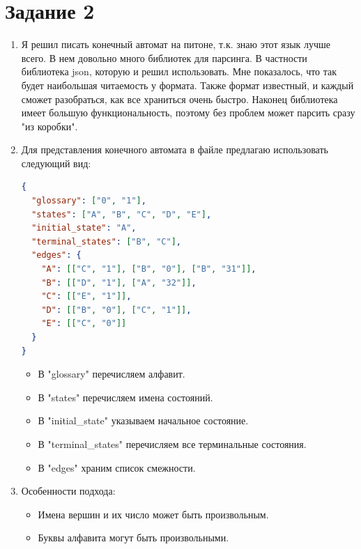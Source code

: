 \documentclass{article}
\begin{document}
	\section*{Задание 2}

\begin{enumerate}
	\item Я решил писать конечный автомат на питоне, т.к. знаю этот язык лучше всего. В нем довольно много библиотек для парсинга. В частности библиотека \textrm{json}, которую и решил использовать. Мне показалось, что так будет наибольшая читаемость у формата. Также формат известный, и каждый сможет разобраться, как все храниться очень быстро. Наконец библиотека имеет большую функциональность, поэтому без проблем может парсить сразу "из коробки".
	
	\item Для представления конечного автомата в файле предлагаю использовать следующий вид:
		
\begin{lstlisting}[language=json,firstnumber=1]
{
  "glossary": ["0", "1"],
  "states": ["A", "B", "C", "D", "E"],
  "initial_state": "A",
  "terminal_states": ["B", "C"],
  "edges": {
  	"A": [["C", "1"], ["B", "0"], ["B", "31"]],
  	"B": [["D", "1"], ["A", "32"]],
  	"C": [["E", "1"]],
  	"D": [["B", "0"], ["C", "1"]],
  	"E": [["C", "0"]]
  }
}
\end{lstlisting}

\begin{itemize}
	\item В "glossary" перечисляем алфавит.
	
	\item В "states" перечисляем имена состояний.
	
	\item В "initial\_state" указываем начальное состояние.
	
	\item В "terminal\_states" перечисляем все терминальные состояния.
	
	\item В "edges" храним список смежности.
\end{itemize}

\item Особенности подхода:
\begin{itemize}
	\item Имена вершин и их число может быть произвольным.
	
	\item Буквы алфавита могут быть произвольными.
	

\end{itemize}
\end{enumerate}
\end{document}

